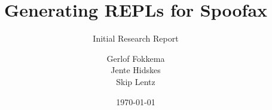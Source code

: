 \title[tudelft-black]{Generating REPLs for Spoofax}
\subtitle[tudelft-black]{Initial Research Report}
\author[tudelft-black]{%
Gerlof Fokkema\\
Jente Hidskes\\
Skip Lentz}
\date{\today}

